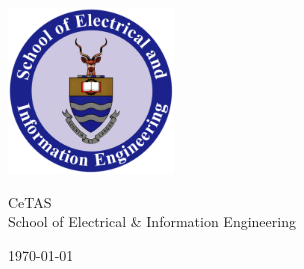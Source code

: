 \documentclass[11pt]{article}
\begin{document}
\begin{titlepage}
		
		
		
		\includegraphics[width=0.33\textwidth]{eie.png} %
		
		
		\vfill
		
		CeTAS\\ School of Electrical \& Information Engineering\\[2cm] %
		
		\vfill
		
		
		{\large \today}\\[2cm] %
		
		\vfill %
		
	\end{titlepage}
\end{document}
